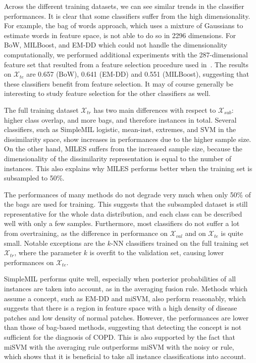 \documentclass[10pt,conference,a4paper]{IEEEtran}
\begin{document}
Across the different training datasets, we can see similar trends in the classifier performances. It is clear that some classifiers suffer from the high dimensionality. For example, the bag of words approach, which uses a mixture of Gaussians to estimate words in feature space, is not able to do so in 2296 dimensions. For BoW, MILBoost, and EM-DD which could not handle the dimensionality computationally, we performed additional experiments with the 287-dimensional feature set that resulted from a feature selection procedure used in~\cite{sorensen2012texture}. The results on $\mathcal{X}_{te}$ are 0.657 (BoW), 0.641 (EM-DD) and 0.551 (MILBoost), suggesting that these classifiers benefit from feature selection. It may of course generally be interesting to study feature selection for the other classifiers as well.

The full training dataset $\mathcal{X}_{tr}$ has two main differences with respect to $\mathcal{X}_{sub}$: higher class overlap, and more bags, and therefore instances in total. Several classifiers, such as SimpleMIL logistic, mean-inst, extremes, and SVM in the dissimilarity space, show increases in performances due to the higher sample size. On the other hand, MILES suffers from the increased sample size, because the dimensionality of the dissimilarity representation is equal to the number of instances. This also explains why MILES performs better when the training set is subsampled to 50\%.

The performances of many methods do not degrade very much when only 50\% of the bags are used for training. This suggests that the subsampled dataset is still representative for the whole data distribution, and each class can be described well with only a few samples. Furthermore, most classifiers do not suffer a lot from overtraining, as the difference in performance on $\mathcal{X}_{val}$ and on $\mathcal{X}_{te}$ is quite small. Notable exceptions are the $k$-NN classifiers trained on the full training set $\mathcal{X}_{tr}$, where the parameter $k$ is overfit to the validation set, causing lower performances on $\mathcal{X}_{te}$.



SimpleMIL performs quite well, especially when posterior probabilities of all instances are taken into account, as in the averaging fusion rule. Methods which assume a concept, such as EM-DD and miSVM, also perform reasonably, which suggests that there is a region in feature space with a high density of disease patches and low density of normal patches. However, the performances are lower than those of bag-based methods, suggesting that detecting the concept is not sufficient for the diagnosis of COPD. This is also supported by the fact that miSVM with the averaging rule outperforms miSVM with the noisy or rule, which shows that it is beneficial to take all instance classifications into account.
\end{document}
